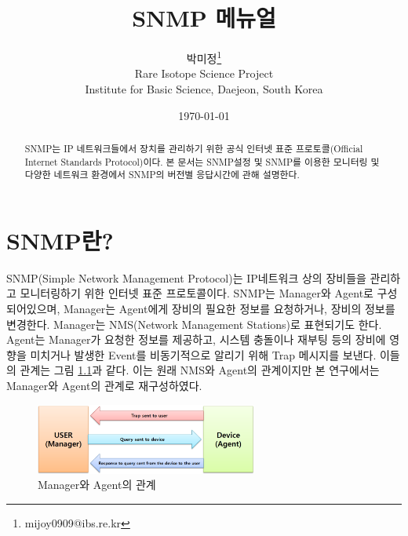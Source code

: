 \documentclass[11pt
  , a4paper
  , article
  , oneside
]{memoir}
\begin{document}
\newcommand{\technumber}{
  RAON Control-Document Series\\
  Revision : v1.0,   Release : Jan. 02. 2015}
\title{\textbf{SNMP 메뉴얼}}

\author{박미정\thanks{mijoy0909@ibs.re.kr} \\

  Rare Isotope Science Project\\
  Institute for Basic Science, Daejeon, South Korea
}
\date{\today}

\renewcommand{\maketitlehooka}{\begin{flushright}\textsf{\technumber}\end{flushright}}

\maketitle

\begin{abstract}
SNMP는 IP 네트워크들에서 장치를 관리하기 위한 공식 인터넷 표준 프로토콜(Official Internet Standards Protocol)\citep{oisp}이다. 본 문서는 SNMP설정 및 SNMP를 이용한 모니터링 및 다양한 네트워크 환경에서 SNMP의 버전별 응답시간에 관해 설명한다. 
\end{abstract}

\chapter{SNMP란?}
SNMP(Simple Network Management Protocol)는 IP네트워크 상의 장비들을 관리하고 모니터링하기 위한 인터넷 표준 프로토콜이다. SNMP는 Manager와 Agent로 구성되어있으며, Manager는 Agent에게 장비의 필요한 정보를 요청하거나, 장비의 정보를 변경한다. Manager는 NMS(Network Management Stations)로 표현되기도 한다. Agent는 Manager가 요청한 정보를 제공하고, 시스템 충돌이나 재부팅 등의 장비에 영향을 미치거나 발생한 Event를 비동기적으로 알리기 위해 Trap 메시지를 보낸다. 이들의 관계는 그림 \ref{fig:relationship_m_a}\citep{essential_snmp}과 같다. 이는 원래 NMS와 Agent의 관계이지만 본 연구에서는 Manager와 Agent의 관계로 재구성하였다.
\begin{figure}[h!]
  \centering
  \includegraphics[width=0.65\textwidth]{./images/relationship_m_a.eps}
  \caption{Manager와 Agent의 관계}
  \label{fig:relationship_m_a}   
\end{figure}
\end{document}

